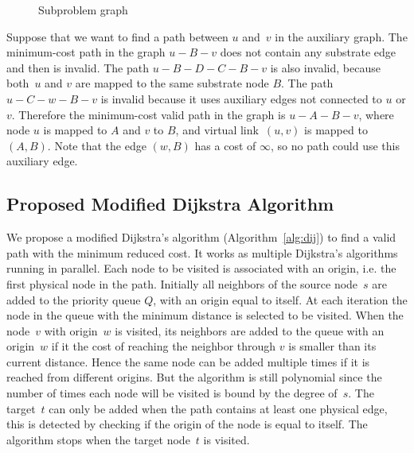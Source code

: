 \documentclass[conference]{IEEEtran}
\begin{document}
\begin{figure}[h]
  \centering
{}
  \caption{Subproblem graph\label{fig:subprob}}
\end{figure}


Suppose that we want to find a path between $u$ and~$v$ in the auxiliary graph.
The minimum-cost path in the graph $u - B - v$ does not contain any substrate edge and then is invalid.
The path $u - B - D - C - B - v$ is also invalid, because both~$u$ and $v$ are mapped to the same substrate node $B$.
The path $u - C - w - B - v$ is invalid because it uses auxiliary edges not connected to $u$ or $v$.
Therefore the minimum-cost valid path in the graph is $u - A - B - v$, where
node $u$ is mapped to $A$ and $v$ to $B$, and virtual link~$(u,v)$ is mapped to~$(A,B)$.
Note that the edge $(w,B)$ has a cost of $\infty$, so no path could use this auxiliary edge.

\subsection{Proposed Modified Dijkstra Algorithm}
We  propose a modified Dijkstra's algorithm (Algorithm~\ref{alg:dij}) to find a valid path with the minimum reduced cost.
It works as multiple Dijkstra's algorithms running in parallel.
Each node to be visited is associated with an origin, i.e. the first physical node in the path.
Initially all neighbors of the source node~$s$ are added to the priority queue $Q$, with an origin equal to itself.
At each iteration the node in the queue with the minimum distance is selected to be visited.
When the node~$v$ with origin~$w$ is visited, its neighbors are added to the queue with an origin~$w$ if it the cost of reaching the neighbor through $v$ is smaller than its current distance.
Hence the same node can be added multiple times if it is reached from different origins.
But the algorithm is still polynomial since the number of times each node will be visited is bound by the degree of~$s$.
The target~$t$ can only be added when the path contains at least one physical edge, this is detected by checking if the origin of the node is equal to itself.
The algorithm stops when the target node~$t$ is visited.
\end{document}
